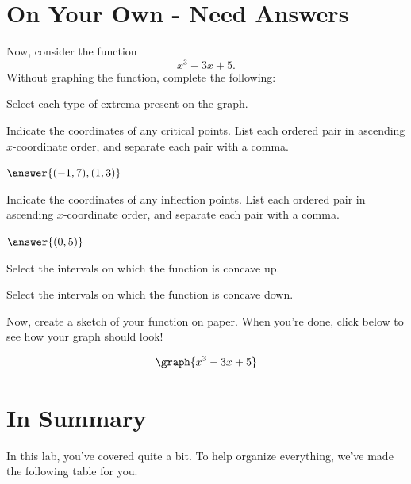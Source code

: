 \documentclass{ximera}
\begin{document}
\section{On Your Own - Need Answers}
\begin{question}
Now, consider the function $$x^3-3x+5\text{.}$$ Without graphing the function, complete the following:

Select each type of extrema present on the graph.
\begin{selectAll}
\end{selectAll}

Indicate the coordinates of any critical points. List each ordered pair in ascending $x$-coordinate order, and separate each pair with a comma.

$\answer{(-1,7),(1,3)}$

Indicate the coordinates of any inflection points. List each ordered pair in ascending $x$-coordinate order, and separate each pair with a comma.

$\answer{(0,5)}$

Select the intervals on which the function is concave up.

\begin{selectAll}
\choice{$[-5,10]$}
\choice{$[1,2]$}
\choice[correct]{$[0,\infty)$}
\choice{$(-\infty, 0]$}
\end{selectAll}

Select the intervals on which the function is concave down.

\begin{selectAll}
\choice{$[0,10]$}
\choice{$[1,2]$}
\choice{$[0,\infty)$}
\choice[correct]{$(-\infty,0]$}
\end{selectAll}

Now, create a sketch of your function on paper. When you're done, click below to see how your graph should look!

\begin{multipleChoice}
\end{multipleChoice}
\begin{feedback}[correct]
\[
\graph{x^3-3x+5}
\]
\end{feedback}
\end{question}

\section{In Summary}
In this lab, you've covered quite a bit. To help organize everything, we've made the following table for you.
\end{document}
